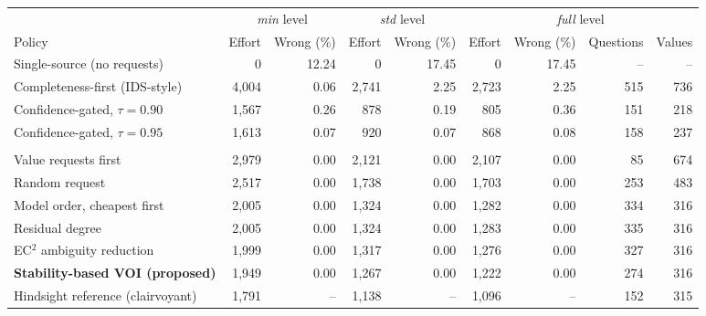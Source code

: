 \begin{tabular}{@{}lrrrrrrrr@{}}
\toprule
 & \multicolumn{2}{c}{\emph{min} level} & \multicolumn{2}{c}{\emph{std} level} & \multicolumn{4}{c}{\emph{full} level} \\
\cmidrule(lr){2-3}\cmidrule(lr){4-5}\cmidrule(l){6-9}
Policy & Effort & Wrong (\%) & Effort & Wrong (\%) & Effort & Wrong (\%) & Questions & Values \\
\midrule
Single-source (no requests) & 0 & 12.24 & 0 & 17.45 & 0 & 17.45 & -- & -- \\
Completeness-first (IDS-style) & 4,004 & 0.06 & 2,741 & 2.25 & 2,723 & 2.25 & 515 & 736 \\
\addlinespace
Confidence-gated, $\tau=0.90$ & 1,567 & 0.26 & 878 & 0.19 & 805 & 0.36 & 151 & 218 \\
Confidence-gated, $\tau=0.95$ & 1,613 & 0.07 & 920 & 0.07 & 868 & 0.08 & 158 & 237 \\
\addlinespace
\multicolumn{9}{@{}l}{\emph{Stability-gated policies}} \\
\quad Value requests first & 2,979 & 0.00 & 2,121 & 0.00 & 2,107 & 0.00 & 85 & 674 \\
\quad Random request & 2,517 & 0.00 & 1,738 & 0.00 & 1,703 & 0.00 & 253 & 483 \\
\quad Model order, cheapest first & 2,005 & 0.00 & 1,324 & 0.00 & 1,282 & 0.00 & 334 & 316 \\
\quad Residual degree & 2,005 & 0.00 & 1,324 & 0.00 & 1,283 & 0.00 & 335 & 316 \\
\quad EC$^2$ ambiguity reduction & 1,999 & 0.00 & 1,317 & 0.00 & 1,276 & 0.00 & 327 & 316 \\
\quad \textbf{Stability-based VOI (proposed)} & 1,949 & 0.00 & 1,267 & 0.00 & 1,222 & 0.00 & 274 & 316 \\
\addlinespace
Hindsight reference (clairvoyant) & 1,791 & -- & 1,138 & -- & 1,096 & -- & 152 & 315 \\
\bottomrule
\end{tabular}
